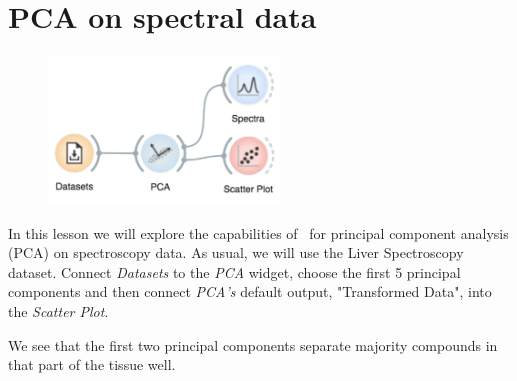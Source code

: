 \chapter{PCA on spectral data}
\label{ch:spectral-PCA}



\begin{figure}
    \centering
    \vspace{-2cm}
    \includegraphics[width=0.55\textwidth]{graphics/ch-spectral_PCA/spectral_PCA-fig1.png}
\end{figure}

In this lesson we will explore the capabilities of \mutation\ for principal component analysis (PCA) on spectroscopy data. As usual, we will use the Liver Spectroscopy dataset. Connect \textit{Datasets} to the \textit{PCA} widget, choose the first 5 principal components and then connect \textit{PCA’s} default output, "Transformed Data", into the \textit{Scatter Plot}. 

We see that the first two principal components separate majority compounds in that part of the tissue well. 


